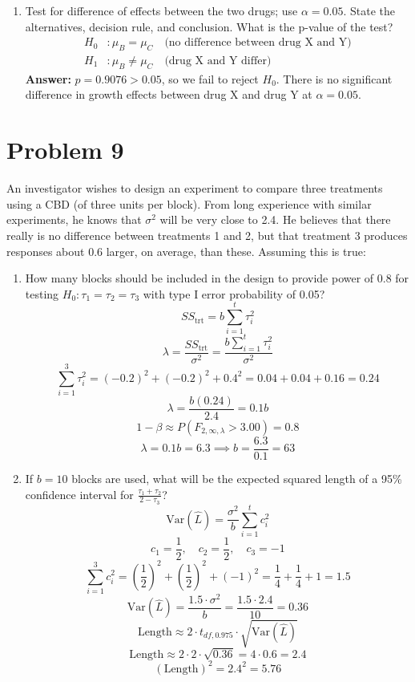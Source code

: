 \documentclass{article}
\begin{document}
\begin{enumerate}
	\item Test for difference of effects between the two drugs; use $\alpha =0.05$. State the alternatives,
	      decision rule, and conclusion. What is the p-value of the test?
	      \begin{align*}
		      H_0 & : \mu_B = \mu_C \quad \text{(no difference between drug X and Y)} \\
		      H_1 & : \mu_B \neq \mu_C \quad \text{(drug X and Y differ)}
	      \end{align*}
	      \textbf{Answer:} $p = 0.9076 > 0.05$, so we fail to reject $H_0$. There is no significant difference in growth effects between drug X and drug Y at $\alpha = 0.05$.

\end{enumerate}

\section{Problem 9}
An investigator wishes to design an experiment to compare three treatments using a CBD (of three
units per block). From long experience with similar experiments, he knows that $\sigma^2$ will be very
close to 2.4. He believes that there really is no difference between treatments 1 and 2, but that
treatment 3 produces responses about 0.6 larger, on average, than these. Assuming this is true:

\begin{enumerate}
	\item How many blocks should be included in the design to provide power of 0.8 for testing
	      $H_0: \tau_1 = \tau_2 = \tau_3$ with type I error probability of 0.05?
	      \[
		      SS_{\text{trt}} = b \sum_{i=1}^t \tau_i^2
	      \]
	      \[
		      \lambda = \frac{SS_{\text{trt}}}{\sigma^2} = \frac{b \sum_{i=1}^t \tau_i^2}{\sigma^2}
	      \]
	      \[
		      \sum_{i=1}^3 \tau_i^2 = (-0.2)^2 + (-0.2)^2 + 0.4^2 = 0.04 + 0.04 + 0.16 = 0.24
	      \]
	      \[
		      \lambda = \frac{b (0.24)}{2.4} = 0.1 b
	      \]
	      \[
		      1-\beta \approx P\left(F_{2,\infty,\lambda} > 3.00 \right) = 0.8
	      \]
	      \[
		      \lambda = 0.1 b = 6.3 \implies b = \frac{6.3}{0.1} = 63
	      \]
	\item If $b=10$ blocks are used, what will be the expected squared length of a 95\% confidence interval
	      for $\frac{\tau_1 + \tau_2}{2-\tau_3}$?
	      \[
		      \text{Var}(\hat L) = \frac{\sigma^2}{b} \sum_{i=1}^t c_i^2
	      \]
	      \[
		      c_1 = \frac{1}{2}, \quad c_2 = \frac{1}{2}, \quad c_3 = -1
	      \]
	      \[
		      \sum_{i=1}^3 c_i^2 = \left(\frac{1}{2}\right)^2 + \left(\frac{1}{2}\right)^2 + (-1)^2 = \frac{1}{4} + \frac{1}{4} + 1 = 1.5
	      \]
	      \[
		      \text{Var}(\hat L) = \frac{1.5 \cdot \sigma^2}{b} = \frac{1.5 \cdot 2.4}{10} = 0.36
	      \]
	      \[
		      \text{Length} \approx 2 \cdot t_{df,0.975} \cdot \sqrt{\text{Var}(\hat L)}
	      \]
	      \[
		      \text{Length} \approx 2 \cdot 2 \cdot \sqrt{0.36} = 4 \cdot 0.6 = 2.4
	      \]
	      \[
		      (\text{Length})^2 = 2.4^2 = 5.76
	      \]
\end{enumerate}
\end{document}
